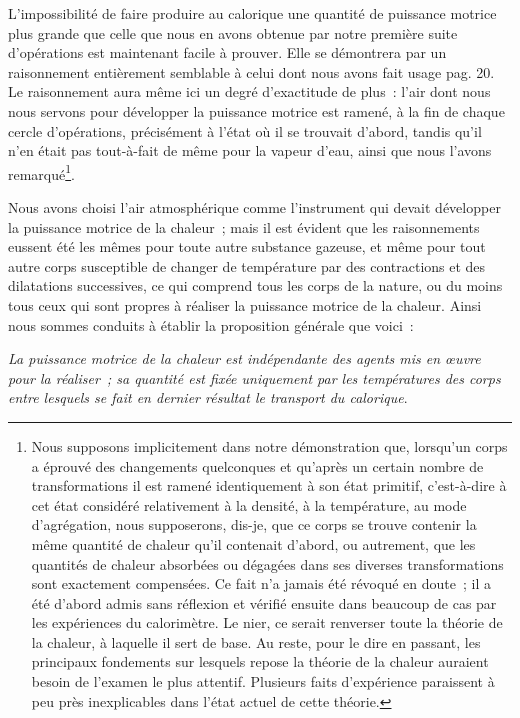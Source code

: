 \documentclass[french,twoside]{book} %
\begin{document}
L’impossibilité de faire produire au calorique une quantité de puissance motrice plus grande que celle que nous en avons obtenue par notre première suite d’opérations est maintenant facile à prouver. Elle se démontrera par un raisonnement entièrement semblable à celui dont nous avons fait usage pag. 20. Le raisonnement aura même ici un degré d’exactitude de plus : l’air dont nous nous servons pour développer la puissance motrice est ramené, à la fin de chaque cercle d’opérations, précisément à l’état où il se trouvait d’abord, tandis qu’il n’en était pas tout-à-fait de même pour la vapeur d’eau, ainsi que nous l’avons remarqué\footnote{Nous supposons implicitement dans notre démonstration que, lorsqu’un corps a éprouvé des changements quelconques et qu’après un certain nombre de transformations il est ramené identiquement à son état primitif, c’est-à-dire à cet état considéré relativement à la densité, à la température, au mode d’agrégation, nous supposerons, dis-je, que ce corps se trouve contenir la même quantité de chaleur qu’il contenait d’abord, ou autrement, que les quantités de chaleur absorbées ou dégagées dans ses diverses transformations sont exactement compensées. Ce fait n’a jamais été révoqué en doute ; il a été d’abord admis sans réflexion et vérifié ensuite dans beaucoup de cas par les expériences du calorimètre. Le nier, ce serait renverser toute la théorie de la chaleur, à laquelle il sert de base. Au reste, pour le dire en passant, les principaux fondements sur lesquels repose la théorie de la chaleur auraient besoin de l’examen le plus attentif. Plusieurs faits d’expérience paraissent à peu près inexplicables dans l’état actuel de cette théorie.}.\par
Nous avons choisi l’air atmosphérique comme l’instrument qui devait développer la puissance motrice de la chaleur ; mais il est évident que les raisonnements eussent été les mêmes pour toute autre substance gazeuse, et même pour tout autre corps susceptible de changer de température par des contractions et des dilatations successives, ce qui comprend tous les corps de la nature, ou du moins tous ceux qui sont propres à réaliser la puissance motrice de la chaleur. Ainsi nous sommes conduits à établir la proposition générale que voici :\par
\emph{La puissance motrice de la chaleur est indépendante des agents mis en œuvre pour la réaliser ; sa quantité est fixée uniquement par les températures des corps entre lesquels se fait en dernier résultat le transport du calorique}.\par
\end{document}
